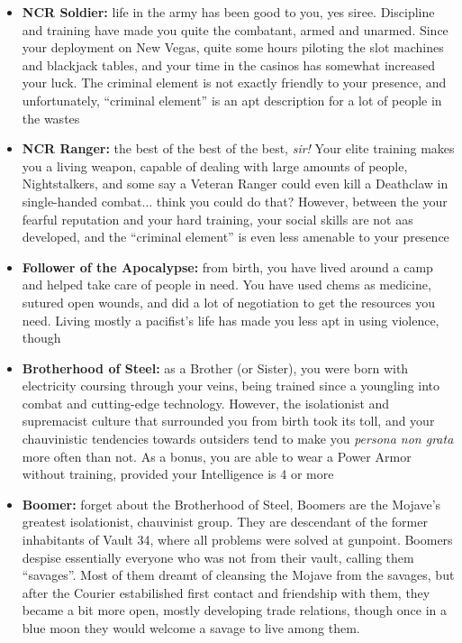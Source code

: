 \documentclass[11pt]{article} %
\begin{document}
\begin{itemize}
	\item \textbf{NCR Soldier:} life in the army has been good to you, yes siree. Discipline and training have made you quite the combatant, armed and unarmed. Since your deployment on New Vegas, quite some hours piloting the slot machines and blackjack tables, and your time in the casinos has somewhat increased your luck. The criminal element is not exactly friendly to your presence, and unfortunately, ``criminal element'' is an apt description for a lot of people in the wastes
	
	\item \textbf{NCR Ranger:} the best of the best of the best, \textit{sir!} Your elite training makes you a living weapon, capable of dealing with large amounts of people, Nightstalkers, and some say a Veteran Ranger could even kill a Deathclaw in single-handed combat... think you could do that? However, between the your fearful reputation and your hard training, your social skills are not aas developed, and the ``criminal element'' is even less amenable to your presence
	
	\item \textbf{Follower of the Apocalypse:} from birth, you have lived around a camp and helped take care of people in need. You have used chems as medicine, sutured open wounds, and did a lot of negotiation to get the resources you need. Living mostly a pacifist's life has made you less apt in using violence, though
	
	\item \textbf{Brotherhood of Steel:} as a Brother (or Sister), you were born with electricity coursing through your veins, being trained since a youngling into combat and cutting-edge technology. However, the isolationist and supremacist culture that surrounded you from birth took its toll, and your chauvinistic tendencies towards outsiders tend to make you \textit{persona non grata} more often than not. As a bonus, you are able to wear a Power Armor without training, provided your Intelligence is 4 or more
	
	\item \textbf{Boomer:} forget about the Brotherhood of Steel, Boomers are the Mojave's greatest isolationist, chauvinist group. They are descendant of the former inhabitants of Vault 34, where all problems were solved at gunpoint. Boomers despise essentially everyone who was not from their vault, calling them ``savages''. Most of them dreamt of cleansing the Mojave from the savages, but after the Courier estabilished first contact and friendship with them, they became a bit more open, mostly developing trade relations, though once in a blue moon they would welcome a savage to live among them.
\end{itemize}
\end{document}
